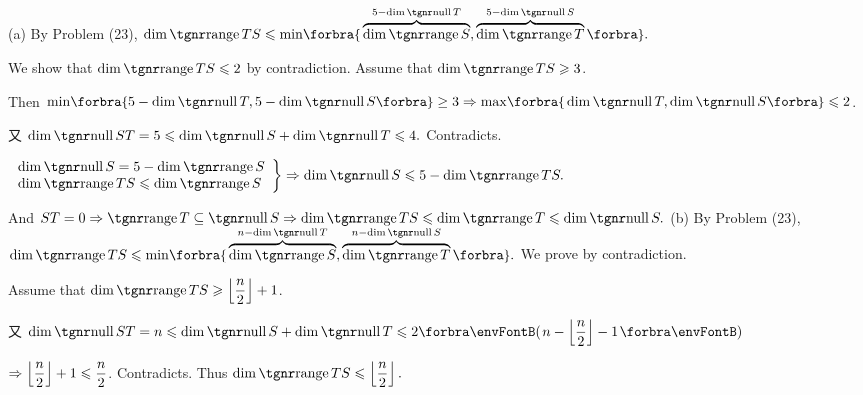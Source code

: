 \par\quad
(a) By Problem (23), $\dim\range TS\leqslant\min\!\Bra{\overbrace{\dim \range S}^{5-\dim\null T}, \overbrace{\dim\range T}^{5-\dim\null S}}.$\par\quad\Ha
We show that $\dim\range TS\leqslant 2$ by contradiction. Assume that $\dim\range TS\geqslant 3$.\par\quad\Ha
Then $\min\!\Bra{5-\dim\null T,5-\dim\null S}\geq 3\Rightarrow\max\!\Bra{\dim\null T,\dim\null S}\leqslant 2$.\par\quad\Ha
又 $\dim\null ST=5\leqslant\dim\null S+\dim\null T\leqslant 4.$ Contradicts.\vspace{8pt}\par\quad\Ha
\Or $\MathRightBrace{l}{\dim\null S=5-\dim\range S\\ \dim\range TS\leqslant\dim\range S}\Rightarrow\dim\null S\leqslant 5-\dim\range TS.$\par\vspace{6pt}\quad\Ha
And $ST=0\Rightarrow\range T\subseteq\null S\Rightarrow\dim\range TS\leqslant\dim\range T\leqslant\dim\null S.$\PfEnd\vspace{10pt}\quad
(b) By Problem (23), $\dim\range TS\leqslant\min\!\Bra{\overbrace{\dim \range S}^{n-\dim\null T}, \overbrace{\dim\range T}^{n-\dim\null S}}.$ We prove by contradiction.\par\quad\Hb
Assume that $\dim\range TS\geqslant \left\lfloor\Frac{n}{2}\right\rfloor+1$.\par\quad\Hb
{}\par\quad\Hb
又 $\dim\null ST=n\leqslant\dim\null S+\dim\null T\leqslant 2\Par{n-\left\lfloor\Frac{n}{2}\right\rfloor-1}$\par\quad\Hb
$\Rightarrow \left\lfloor{\displaystyle{\frac{n}{2}}}\right\rfloor+1\leqslant{\displaystyle{\frac{n}{2}}}$. Contradicts. Thus $\dim\range TS\leqslant \left\lfloor\Frac{n}{2}\right\rfloor.$\PfEnd\vspace{15pt}\quad\Hb

